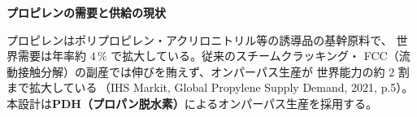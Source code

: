 
\begin{frame}[t]

  \vspace*{3mm}   %
  {\bfseries\large プロピレンの需要と供給の現状}\par
  \vspace{0.3em}
  {\scriptsize\raggedright
    プロピレンはポリプロピレン・アクリロニトリル等の誘導品の基幹原料で、
    世界需要は年率約 $4$\,\% で拡大している。従来のスチームクラッキング・
    FCC（流動接触分解）の副産では伸びを賄えず、オンパーパス生産が
    世界能力の約 $2$ 割まで拡大している{\tiny\,（IHS Markit, Global Propylene Supply Demand, 2021, p.5）}。
    本設計は\textbf{PDH（プロパン脱水素）}によるオンパーパス生産を採用する。\par}

  \vspace{0.4em}


\end{frame}
